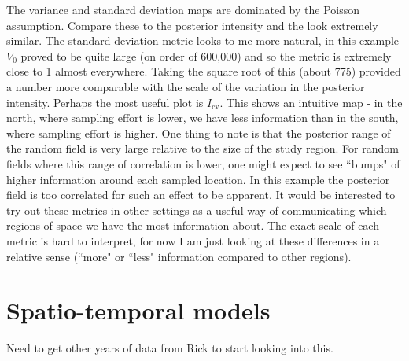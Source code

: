 \documentclass[12pt]{article}
\begin{document}
The variance and standard deviation maps are dominated by the Poisson assumption.  Compare these to the posterior intensity and the look extremely similar.  The standard deviation metric looks to me more natural, in this example $V_0$ proved to be quite large (on order of 600,000) and so the metric is extremely close to 1 almost everywhere.  Taking the square root of this (about 775) provided a number more comparable with the scale of the variation in the posterior intensity.  Perhaps the most useful plot is $I_{\text{cv}}$.  This shows an intuitive map - in the north, where sampling effort is lower, we have less information than in the south, where sampling effort is higher.  One thing to note is that the posterior range of the random field is very large relative to the size of the study region.  For random fields where this range of correlation is lower, one might expect to see ``bumps" of higher information around each sampled location.  In this example the posterior field is too correlated for such an effect to be apparent.  It would be interested to try out these metrics in other settings as a useful way of communicating which regions of space we have the most information about.  The exact scale of each metric is hard to interpret, for now I am just looking at these differences in a relative sense (``more" or ``less" information compared to other regions).  

\section*{Spatio-temporal models}

Need to get other years of data from Rick to start looking into this.  
\end{document}

